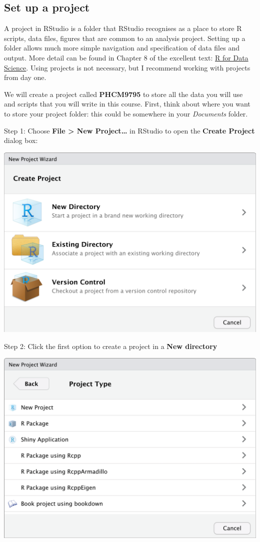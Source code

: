 \documentclass[
]{memoir}
\begin{document}
\hypertarget{set-up-a-project}{%
\subsection{Set up a project}\label{set-up-a-project}}

A project in RStudio is a folder that RStudio recognises as a place to store R scripts, data files, figures that are common to an analysis project. Setting up a folder allows much more simple navigation and specification of data files and output. More detail can be found in Chapter 8 of the excellent text: \href{https://r4ds.had.co.nz/workflow-projects.html}{R for Data Science}. Using projects is not necessary, but I recommend working with projects from day one.

We will create a project called \textbf{PHCM9795} to store all the data you will use and scripts that you will write in this course. First, think about where you want to store your project folder: this could be somewhere in your \emph{Documents} folder.

Step 1: Choose \textbf{File \textgreater{} New Project\ldots{}} in RStudio to open the \textbf{Create Project} dialog box:

\includegraphics[width=0.75\linewidth]{img/NewProject-1}

Step 2: Click the first option to create a project in a \textbf{New directory}

\includegraphics[width=0.75\linewidth]{img/NewProject-2}
\end{document}
